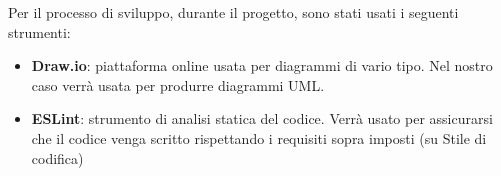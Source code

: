 Per il processo di sviluppo, durante il progetto, sono stati usati i seguenti strumenti:
\begin{itemize}
\item \textbf{Draw.io}: piattaforma online usata per diagrammi di vario tipo. Nel nostro caso verrà usata per produrre diagrammi UML.
\item \textbf{ESLint}: strumento di analisi statica del codice. Verrà usato per assicurarsi che il codice venga scritto rispettando i requisiti sopra imposti (su Stile di codifica)
\end{itemize} 